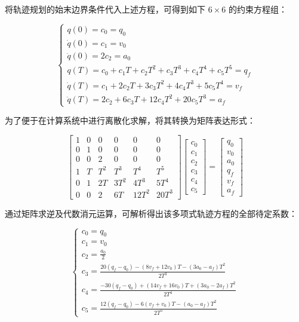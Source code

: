 将轨迹规划的始末边界条件代入上述方程，可得到如下 $6 \times 6$ 的约束方程组：

\begin{equation}
    \begin{cases}
        q(0) = c_0 = q_0 \\
        \dot{q}(0) = c_1 = v_0 \\
        \ddot{q}(0) = 2c_2 = a_0 \\
        q(T) = c_0 + c_1 T + c_2 T^2 + c_3 T^3 + c_4 T^4 + c_5 T^5 = q_f \\
        \dot{q}(T) = c_1 + 2c_2 T + 3c_3 T^2 + 4c_4 T^3 + 5c_5 T^4 = v_f \\
        \ddot{q}(T) = 2c_2 + 6c_3 T + 12c_4 T^2 + 20c_5 T^3 = a_f
    \end{cases}
\end{equation}

为了便于在计算系统中进行离散化求解，将其转换为矩阵表达形式：

\begin{equation}
    \begin{bmatrix}
        1 & 0 & 0 & 0 & 0 & 0 \\
        0 & 1 & 0 & 0 & 0 & 0 \\
        0 & 0 & 2 & 0 & 0 & 0 \\
        1 & T & T^2 & T^3 & T^4 & T^5 \\
        0 & 1 & 2T & 3T^2 & 4T^3 & 5T^4 \\
        0 & 0 & 2 & 6T & 12T^2 & 20T^3
    \end{bmatrix}
    \begin{bmatrix}
        c_0 \\ c_1 \\ c_2 \\ c_3 \\ c_4 \\ c_5
    \end{bmatrix}
    =
    \begin{bmatrix}
        q_0 \\ v_0 \\ a_0 \\ q_f \\ v_f \\ a_f
    \end{bmatrix}
\end{equation}

通过矩阵求逆及代数消元运算，可解析得出该多项式轨迹方程的全部待定系数：

\begin{equation}
    \begin{cases}
        c_0 = q_0 \\
        c_1 = v_0 \\
        c_2 = \frac{a_0}{2} \\
        c_3 = \frac{20(q_f - q_0) - (8v_f + 12v_0)T - (3a_0 - a_f)T^2}{2T^3} \\
        c_4 = \frac{-30(q_f - q_0) + (14v_f + 16v_0)T + (3a_0 - 2a_f)T^2}{2T^4} \\
        c_5 = \frac{12(q_f - q_0) - 6(v_f + v_0)T - (a_0 - a_f)T^2}{2T^5}
    \end{cases}
\end{equation}

